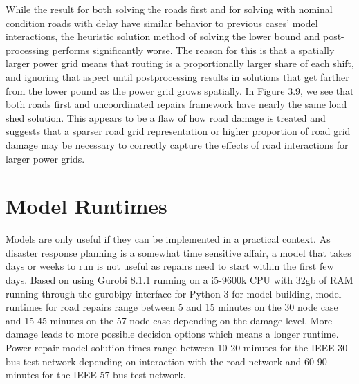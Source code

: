 While the result for both solving the roads first and for solving with nominal condition roads with delay have similar behavior to previous cases' model interactions, the heuristic solution method of solving the lower bound and post-processing performs significantly worse. The reason for this is that a spatially larger power grid means that routing is a proportionally larger share of each shift, and ignoring that aspect until postprocessing results in solutions that get farther from the lower pound as the power grid grows spatially. In Figure 3.9, we see that both roads first and uncoordinated repairs framework have nearly the same load shed solution. This appears to be a flaw of how road damage is treated and suggests that a sparser road grid representation or higher proportion of road grid damage may be necessary to correctly capture the effects of road interactions for larger power grids.

\section{Model Runtimes}
Models are only useful if they can be implemented in a practical context. As disaster response planning is a somewhat time sensitive affair, a model that takes days or weeks to run is not useful as repairs need to start within the first few days. Based on using Gurobi 8.1.1 running on a i5-9600k CPU with 32gb of RAM running through the gurobipy interface for Python 3 for model building, model runtimes for road repairs range between 5 and 15 minutes on the 30 node case and 15-45 minutes on the 57 node case depending on the damage level. More damage leads to more possible decision options which means a longer runtime. Power repair model solution times range between 10-20 minutes for the IEEE 30 bus test network depending on interaction with the road network and 60-90 minutes for the IEEE 57 bus test network.


